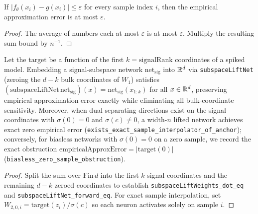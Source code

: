 \begin{lemma}\label{lem:approx_error_pointwise}
\leanok
{}
If $|f_\theta(x_i)-g(x_i)|\le\varepsilon$ for every sample index $i$, then the empirical approximation error is at most $\varepsilon$.
\end{lemma}
\begin{proof}
\leanok
The average of numbers each at most $\varepsilon$ is at most $\varepsilon$. Multiply the resulting sum bound by $n^{-1}$.
\end{proof}

\begin{lemma}\label{lem:expressivity_subspace}
\leanok
{}
Let the target be a function of the first $k = \mathrm{signalRank}$ coordinates of a spiked model. Embedding a signal-subspace network $\mathrm{net}_{\mathrm{sig}}$ into $\mathbb{R}^d$ via \texttt{subspaceLiftNet} (zeroing the $d-k$ bulk coordinates of $W_1$) satisfies $(\mathrm{subspaceLiftNet}\,\mathrm{net}_{\mathrm{sig}})(x) = \mathrm{net}_{\mathrm{sig}}(x_{1:k})$ for all $x\in\mathbb{R}^d$, preserving empirical approximation error exactly while eliminating all bulk-coordinate sensitivity. Moreover, when dual separating directions exist on the signal coordinates with $\sigma(0)=0$ and $\sigma(c)\ne 0$, a width-$n$ lifted network achieves exact zero empirical error (\texttt{exists\_exact\_sample\_interpolator\_of\_anchor}); conversely, for biasless networks with $\sigma(0)=0$ on a zero sample, we record the exact obstruction $\mathrm{empiricalApproxError} = |\mathrm{target}(0)|$ (\texttt{biasless\_zero\_sample\_obstruction}).
\end{lemma}
\begin{proof}
\leanok
Split the sum over $\mathrm{Fin}\,d$ into the first $k$ signal coordinates and the remaining $d-k$ zeroed coordinates to establish \texttt{subspaceLiftWeights\_dot\_eq} and \texttt{subspaceLiftNet\_forward\_eq}. For exact sample interpolation, set $W_{2,0,i} = \mathrm{target}(z_i)/\sigma(c)$ so each neuron activates solely on sample $i$.
\end{proof}

